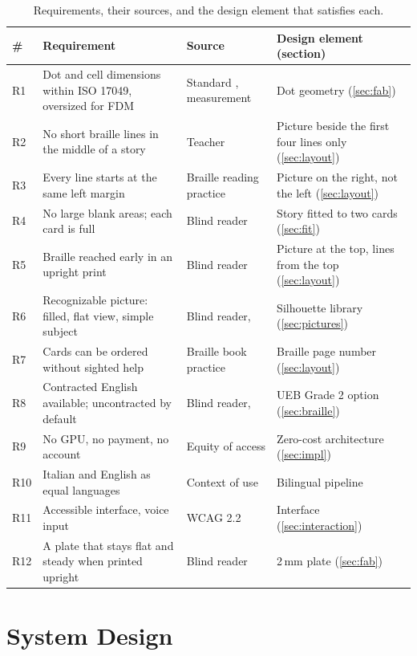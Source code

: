 \documentclass[conference]{IEEEtran}
\begin{document}
\begin{table}[t]
\caption{Requirements, their sources, and the design element that satisfies each.}
\label{tab:req}
\centering
\begin{tabular}{llll}
\toprule
\# & Requirement & Source & Design element (section) \\
\midrule
R1 & Dot and cell dimensions within ISO 17049, oversized for FDM & Standard \cite{iso17049}, measurement \cite{zolek2024} & Dot geometry (\ref{sec:fab}) \\
R2 & No short braille lines in the middle of a story & Teacher & Picture beside the first four lines only (\ref{sec:layout}) \\
R3 & Every line starts at the same left margin & Braille reading practice & Picture on the right, not the left (\ref{sec:layout}) \\
R4 & No large blank areas; each card is full & Blind reader & Story fitted to two cards (\ref{sec:fit}) \\
R5 & Braille reached early in an upright print & Blind reader & Picture at the top, lines from the top (\ref{sec:layout}) \\
R6 & Recognizable picture: filled, flat view, simple subject & Blind reader, \cite{theurel2013,thompson2003} & Silhouette library (\ref{sec:pictures}) \\
R7 & Cards can be ordered without sighted help & Braille book practice & Braille page number (\ref{sec:layout}) \\
R8 & Contracted English available; uncontracted by default & Blind reader, \cite{ueb} & UEB Grade 2 option (\ref{sec:braille}) \\
R9 & No GPU, no payment, no account & Equity of access & Zero-cost architecture (\ref{sec:impl}) \\
R10 & Italian and English as equal languages & Context of use & Bilingual pipeline \\
R11 & Accessible interface, voice input & WCAG 2.2 \cite{wcag22} & Interface (\ref{sec:interaction}) \\
R12 & A plate that stays flat and steady when printed upright & Blind reader & 2\,mm plate (\ref{sec:fab}) \\
\bottomrule
\end{tabular}
\end{table}

\section{System Design}\label{sec:design}
\end{document}
